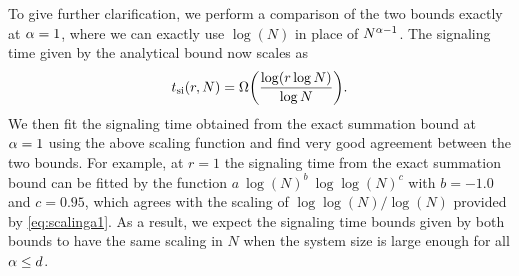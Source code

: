 To give further clarification, we perform a comparison of the two bounds exactly at $\alpha=1$, where we can exactly use $\log(N)$ in place of $N^{\alpha-1}$. The signaling time given by the analytical bound now scales as
\begin{equation}
	t_\text{si}(r,N) = \W{\frac{\log(r\log N)}{\log N}}.\label{eq:scalinga1}
\end{equation}
We then fit the signaling time obtained from the exact summation bound at $\alpha=1$ using the above scaling function and find very good agreement between the two bounds. For example, at $r=1$ the signaling time from the exact summation bound can be fitted by the function $ a\:\log(N)^b\:\log\log(N)^c$ with $b=-1.0$ and $c=0.95$, which agrees with the scaling of $\log\log(N)/\log(N)$ provided by \cref{eq:scalinga1}. As a result, we expect the signaling time bounds given by both bounds to have the same scaling in $N$ when the system size is large enough for all $\alpha\le d$.

